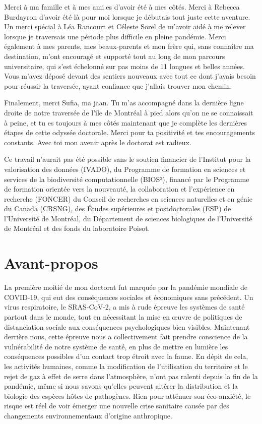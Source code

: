 \documentclass[12pt,twoside,phd]{dms}
\numberwithin{equation}{section}
\numberwithin{table}{chapter}
\numberwithin{figure}{chapter}
\begin{document}
Merci à ma famille et à mes ami.es d'avoir été à mes côtés. Merci à Rebecca
Burdayron d'avoir été là pour moi lorsque je débutais tout juste cette aventure.
Un merci spécial à Léa Rancourt et Céleste Sorel de m'avoir aidé à me relever
lorsque je traversais une période plus difficile en pleine pandémie. Merci
également à mes parents, mes beaux-parents et mon frère qui, sans connaître ma
destination, m'ont encouragé et supporté tout au long de mon parcours
universitaire, qui s'est échelonné sur pas moins de 11 longues et belles années.
Vous m'avez déposé devant des sentiers nouveaux avec tout ce dont j'avais besoin
pour réussir la traversée, ayant confiance que j'allais trouver mon chemin.

Finalement, merci Sufia, ma jaan. Tu m'as accompagné dans la dernière ligne
droite de notre traversée de l'île de Montréal à pied alors qu'on ne se
connaissait à peine, et tu es toujours à mes côtés maintenant que je complète
les dernières étapes de cette odyssée doctorale. Merci pour ta positivité et tes
encouragements constants. Avec toi mon avenir après le doctorat est radieux. 

Ce travail n'aurait pas été possible sans le soutien financier de l'Institut
pour la valorisation des données (IVADO), du Programme de formation en sciences
et services de la biodiversité computationnelle (BIOS²), financé par le
Programme de formation orientée vers la nouveauté, la collaboration et
l'expérience en recherche (FONCER) du Conseil de recherches en sciences
naturelles et en génie du Canada (CRSNG), des Études supérieures et
postdoctorales (ESP) de l'Université de Montréal, du Département de sciences
biologiques de l'Université de Montréal et des fonds du laboratoire Poisot. 

\chapter*{Avant-propos}

La première moitié de mon doctorat fut marquée par la pandémie mondiale de
COVID-19, qui eut des conséquences sociales et économiques sans précédent. Un
virus respiratoire, le SRAS-CoV-2, a mis à rude épreuve les systèmes de santé
partout dans le monde, tout en nécessitant la mise en œuvre de politiques de
distanciation sociale aux conséquences psychologiques bien visibles. Maintenant
derrière nous, cette épreuve nous a collectivement fait prendre conscience de la
vulnérabilité de notre système de santé, en plus de mettre en lumière les
conséquences possibles d'un contact trop étroit avec la faune. En dépit de cela,
les activités humaines, comme la modification de l'utilisation du territoire et
le rejet de gaz à effet de serre dans l'atmosphère, n'ont pas ralenti depuis la
fin de la pandémie, même si nous savons qu'elles peuvent altérer la distribution
et la biologie des espèces hôtes de pathogènes. Rien pour atténuer son
éco-anxiété, le risque est réel de voir émerger une nouvelle crise sanitaire
causée par des changements environnementaux d'origine anthropique. 
\end{document}
